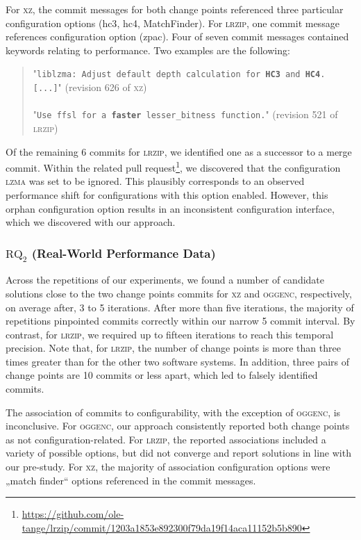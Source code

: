 \documentclass[sigconf, screen]{acmart}
\begin{document}
	For \textsc{xz}, the commit messages for both change points referenced three particular configuration options (\textsf{hc3}, \textsf{hc4}, \textsf{MatchFinder}). For \textsc{lrzip}, one commit message references configuration option (\textsf{zpac}). Four of seven commit messages contained keywords relating to performance. Two examples are the following:
	
	\begin{quotation}
		"\texttt{\footnotesize liblzma: Adjust default depth calculation for \textbf{HC3} and \textbf{HC4}. [...]}" (revision 626 of \textsc{xz})\\\\
		"\texttt{\footnotesize Use ffsl for a \textbf{faster} lesser\_bitness function.}" (revision 521 of \textsc{lrzip})
	\end{quotation}
	
	Of the remaining 6 commits for \textsc{lrzip}, we identified one as a successor to a merge commit. Within the related pull request\footnote{\url{https://github.com/ole-tange/lrzip/commit/1203a1853e892300f79da19f14aca11152b5b890}}, we discovered that the configuration \textsc{lzma} was set to be ignored. This plausibly corresponds to an observed performance shift for configurations with this option enabled. However, this orphan configuration option results in an inconsistent configuration interface, which we discovered with our approach. 
	
	\subsubsection{$\text{RQ}_2$ (Real-World Performance Data)}
	Across the repetitions of our experiments, we found a number of candidate solutions close to the two change points commits for \textsc{xz} and \textsc{oggenc}, respectively, on average after, 3 to 5 iterations. After more than five iterations, the majority of repetitions pinpointed commits correctly within our narrow 5 commit interval. By contrast, for \textsc{lrzip}, we required up to fifteen iterations to reach this temporal precision. Note that, for \textsc{lrzip}, the number of change points is more than three times greater than for the other two software systems. In addition, three pairs of change points are 10 commits or less apart, which led to falsely identified commits. 
	
	The association of commits to configurability, with the exception of \textsc{oggenc}, is inconclusive. For \textsc{oggenc}, our approach consistently reported both change points as not configuration-related. For \textsc{lrzip}, the reported associations included a variety of possible options, but did not converge and report solutions in line with our pre-study. For \textsc{xz}, the majority of association configuration options were „match finder“ options referenced in the commit messages.
	
\end{document}
